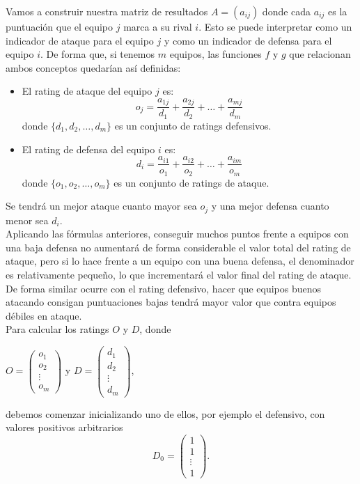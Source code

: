Vamos a construir nuestra matriz de resultados $A=(a_{ij})$ donde cada $a_{ij}$ es la puntuación que el equipo $j$ marca a su rival $i$. Esto se puede interpretar como un indicador de ataque para el equipo $j$ y como un indicador de defensa para el equipo $i$. De forma que, si tenemos $m$ equipos, las funciones $f$ y $g$ que relacionan ambos conceptos quedarían así definidas: 
\begin{itemize}
	\item El rating de ataque del equipo $j$ es:
	\begin{equation}
	o_{j} = \dfrac{a_{1j}}{d_{1}} + \dfrac{a_{2j}}{d_{2}} + \dots + \dfrac{a_{mj}}{d_{m}}  \label{ofens}
	\end{equation} 
	donde $\{d_{1},d_{2}, \dots ,d_{m}\}$ es un conjunto de ratings defensivos. 
	\item El rating de defensa del equipo $i$ es:
	\begin{equation}
	d_{i} = \dfrac{a_{i1}}{o_{1}} + \dfrac{a_{i2}}{o_{2}} + \dots + \dfrac{a_{im}}{o_{m}}  \label{defens}
	\end{equation} 
	donde $\{o_{1},o_{2}, \dots ,o_{m}\}$ es un conjunto de ratings de ataque. 
\end{itemize}

Se tendrá un mejor ataque cuanto mayor sea $o_{j}$ y una mejor defensa cuanto menor sea $d_{i}$.\\
Aplicando las fórmulas anteriores, conseguir muchos puntos frente a equipos con una baja defensa no aumentará de forma considerable el valor total del rating de ataque, pero si lo hace frente a un equipo con una buena defensa, el denominador es relativamente pequeño, lo que incrementará el valor final del rating de ataque. De forma similar ocurre con el rating defensivo, hacer que equipos buenos atacando consigan puntuaciones bajas tendrá mayor valor que contra equipos débiles en ataque.\\

Para calcular los ratings $O$ y $D$, donde
\begin{center}
	$O=\left(\begin{array}{c}
o_{1}\\
o_{2}\\
\vdots \\
o_{m}
\end{array} \right)$ y $D=\left(\begin{array}{c}
d_{1}\\
d_{2}\\
\vdots \\
d_{m}
\end{array} \right)$,
\end{center}
debemos comenzar inicializando uno de ellos, por ejemplo el defensivo, con valores positivos arbitrarios
\[D_{0}=
\left(\begin{array}{c}
1\\
1\\
\vdots \\
1
\end{array} \right).
\]

